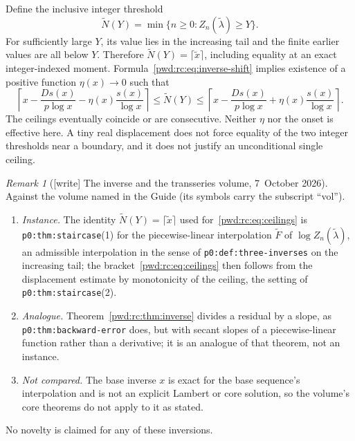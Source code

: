 \documentclass[11pt,letterpaper]{article}
\numberwithin{equation}{section}
\theoremstyle{remark}\newtheorem{remark}[theorem]{Remark}
\newcommand{\file}[1]{\nolinkurl{#1}}
\begin{document}
Define the inclusive integer threshold
\[
 \widetilde N(Y)=\min\{n\ge0:Z_n(\widetilde\lambda)\ge Y\}.
\]
For sufficiently large $Y$, its value lies in the increasing tail and the finite earlier values are all below $Y$. Therefore $\widetilde N(Y)=\lceil\widetilde x\rceil$, including equality at an exact integer-indexed moment. Formula~\eqref{pwd:rc:eq:inverse-shift} implies existence of a positive function $\eta(x)\to0$ such that
\begin{equation}\label{pwd:rc:eq:ceilings}
 \left\lceil x-\frac{D s(x)}{p\log x}-\eta(x)\frac{s(x)}{\log x}\right\rceil
 \le\widetilde N(Y)\le
 \left\lceil x-\frac{D s(x)}{p\log x}+\eta(x)\frac{s(x)}{\log x}\right\rceil.
\end{equation}
The ceilings eventually coincide or are consecutive. Neither $\eta$ nor the onset is effective here. A tiny real displacement does not force equality of the two integer thresholds near a boundary, and it does not justify an unconditional single ceiling.

\begin{remark}[{[write]} The inverse and the transseries volume, 7~October 2026]\label{pwd:rc:rem:transseries}
Against the volume named in the Guide (its symbols carry the subscript
``vol'').
\begin{enumerate}[label=(\alph*),leftmargin=*]
\item \emph{Instance.} The identity $\widetilde N(Y)=\lceil\widetilde x\rceil$
used for~\eqref{pwd:rc:eq:ceilings} is \file{p0:thm:staircase}(1) for the
piecewise-linear interpolation $\widetilde F$ of $\log Z_n(\widetilde\lambda)$,
an admissible interpolation in the sense of \file{p0:def:three-inverses} on
the increasing tail; the bracket~\eqref{pwd:rc:eq:ceilings} then follows from
the displacement estimate by monotonicity of the ceiling, the setting of
\file{p0:thm:staircase}(2).
\item \emph{Analogue.} Theorem~\ref{pwd:rc:thm:inverse} divides a residual by
a slope, as \file{p0:thm:backward-error} does, but with secant slopes of a
piecewise-linear function rather than a derivative; it is an analogue of that
theorem, not an instance.
\item \emph{Not compared.} The base inverse $x$ is exact for the base
sequence's interpolation and is not an explicit Lambert or core solution, so
the volume's core theorems do not apply to it as stated.
\end{enumerate}
No novelty is claimed for any of these inversions.
\end{remark}
\end{document}
